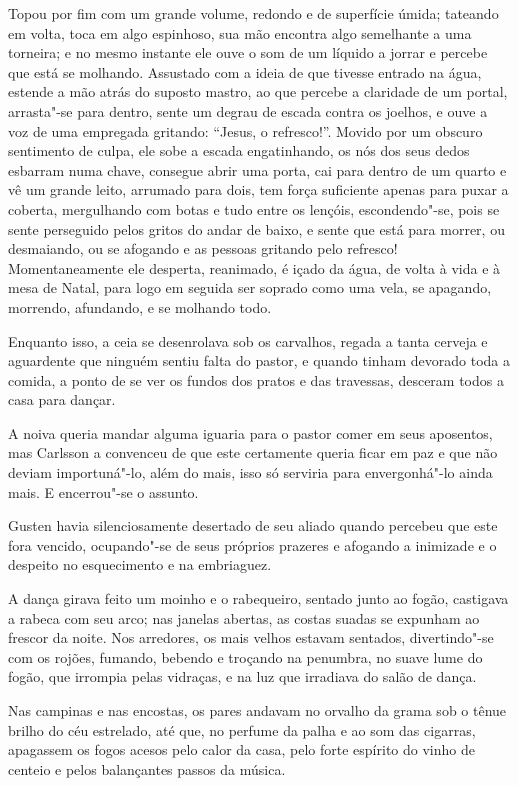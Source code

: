 Topou por fim com um grande volume,
redondo e de superfície úmida; tateando em volta, toca em algo espinhoso, sua mão
encontra algo semelhante a uma torneira; e no mesmo instante ele ouve o som de um
líquido a jorrar e percebe que está se molhando. Assustado com a ideia de que
tivesse entrado na água, estende a mão atrás do suposto mastro, ao que percebe
a claridade de um portal, arrasta"-se para dentro, sente um degrau de
escada contra os joelhos, e ouve a voz de uma empregada gritando: ``Jesus, o
refresco!''. Movido por um obscuro sentimento de culpa, ele sobe a escada
engatinhando, os nós dos seus dedos esbarram numa chave, consegue abrir uma
porta, cai para dentro de um quarto e vê um grande leito, arrumado para
dois, tem força suficiente apenas para puxar a coberta, mergulhando com botas e tudo
entre os lençóis, escondendo"-se, pois se sente perseguido pelos gritos do
andar de baixo, e sente que está para morrer, ou desmaiando, ou se afogando e as
pessoas gritando pelo refresco! Momentaneamente ele desperta, reanimado, é
içado da água, de volta à vida e à mesa de Natal, para logo em seguida ser
soprado como uma vela, se apagando, morrendo, afundando, e se molhando todo.

Enquanto isso, a ceia se desenrolava sob os carvalhos, regada a tanta
cerveja e aguardente que ninguém sentiu falta do pastor, e quando tinham
devorado toda a comida, a ponto de se ver os fundos dos pratos e das travessas,
desceram todos a casa para dançar. 

A noiva queria mandar alguma iguaria para o
pastor comer em seus aposentos, mas Carlsson a convenceu de que este certamente
queria ficar em paz e que não deviam importuná"-lo, além do mais, isso só serviria para
envergonhá"-lo ainda mais. E encerrou"-se o assunto. 

Gusten havia silenciosamente desertado de seu aliado quando percebeu que este fora vencido,
ocupando"-se de seus próprios prazeres e afogando a inimizade e o despeito
no esquecimento e na embriaguez. 

A dança girava feito um moinho e o rabequeiro, sentado junto ao fogão, 
castigava a rabeca com seu arco; nas janelas abertas, as costas suadas 
se expunham ao frescor da noite. Nos arredores, os mais velhos estavam
sentados, divertindo"-se com os rojões, fumando, bebendo e troçando na
penumbra, no suave lume do fogão, que irrompia pelas vidraças, e na luz
que irradiava do salão de dança.

Nas campinas e nas encostas, os pares andavam no orvalho da grama sob o 
tênue brilho do céu estrelado, até que, no perfume da palha e ao som das
cigarras, apagassem os fogos acesos pelo calor da casa, pelo forte espírito do
vinho de centeio e pelos balançantes passos da música. 

